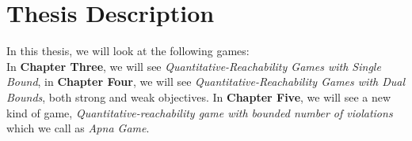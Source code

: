  \section{Thesis Description}
 In this thesis, we will look at the following games:\\
 In \textbf{Chapter Three}, we will see \textit{Quantitative-Reachability Games with Single Bound}, in \textbf{Chapter Four}, we will see \textit{Quantitative-Reachability Games with Dual Bounds}, both strong and weak objectives. In \textbf{Chapter Five}, we will see a new kind of game, \textit{Quantitative-reachability game with bounded number of violations} which we call as \textit{Apna Game}.
 
 

	
